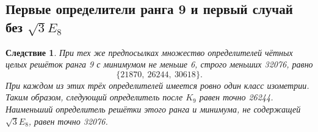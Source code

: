 \documentclass[11pt,a4paper]{article}
\newtheorem{corollary}[theorem]{Следствие}
\theoremstyle{remark}\newtheorem{remark}[theorem]{Замечание}
\begin{document}
\subsection{Первые определители ранга 9 и первый случай без \texorpdfstring{$\sqrt3E_8$}{sqrt(3)E8}}

\begin{corollary}\label{cor:spectrum9}
При тех же предпосылках множество определителей чётных целых решёток ранга 9 с минимумом не меньше 6, строго меньших 32076, равно
\[
\{21870,\ 26244,\ 30618\}.
\]
При каждом из этих трёх определителей имеется ровно один класс изометрии. Таким образом, следующий определитель после $K_9$ равен точно 26244. Наименьший определитель решётки этого ранга и минимума, не содержащей $\sqrt3E_8$, равен точно 32076.
\end{corollary}
\end{document}
